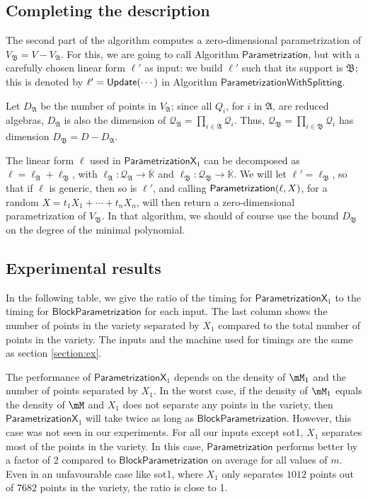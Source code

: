 \documentclass[12pt]{article}
\newcommand{\mainalgoname}{\mathsf{ BlockParametrization}}
\newcommand{\lf}{X}
\newcommand{\residueI}{\mathscr{Q}}
\def\Kbar {{\ensuremath{\overline{\mathbb{K}}}}}
\begin{document}

\subsection{Completing the description}

The second part of the algorithm computes a
zero-dimensional parametrization of
$V_\mathfrak{B}=V-V_\mathfrak{A}$. For this, we are going to call
Algorithm $\mathsf{ Parametrization}$, but with a carefully chosen linear
form $\ell'$ as input: we build $\ell'$ such that its support is
$\mathfrak{B}$; this is denoted by $\ell'={\sf Update}(\cdots)$ in
Algorithm $\mathsf{ParametrizationWithSplitting}$.

Let $D_{\mathfrak{A}}$ be the number of points in $V_{\mathfrak{A}}$;
since all $Q_i$, for $i$ in $\mathfrak{A}$, are reduced algebras,
$D_\mathfrak{A}$ is also the dimension of $\residueI_\mathfrak{A} =
\prod_{i \in \mathfrak{A}} \residueI_i$. Thus, $\residueI_\mathfrak{B}=\prod_{i \in \mathfrak{B}} \residueI_i$
has dimension $D_{\mathfrak{B}}=D-D_{\mathfrak{A}}$.

The linear form $\ell$ used in $\mathsf{ParametrizationX}_1$ can be
decomposed as $\ell= \ell_{\mathfrak{A}} + \ell_{\mathfrak{B}}$, with
$\ell_\mathfrak{A}: \residueI_\mathfrak{A} \to \Kbar$ and
$\ell_\mathfrak{B}: \residueI_\mathfrak{B} \to \Kbar$. We will let
$\ell'=\ell_{\mathfrak{B}}$, so that if $\ell$ is generic, then so is
$\ell'$, and calling ${\sf Parametrization}(\ell,\lf)$, for a random
$\lf=t_1 X_1 + \cdots + t_n X_n$, will then return a zero-dimensional
parametrization of $V_{\mathfrak{B}}$. In that algorithm, we should
of course use the bound $D_\mathfrak{B}$ on the degree of the minimal
polynomial.





\subsection{Experimental results}
In the following table, we give the ratio of the timing for $\mathsf{ParametrizationX}_1$
to the timing for $\mainalgoname$ for each input. The last column
shows the number of points in the variety separated by $X_1$ compared to the 
total number of points in the variety.
The inputs and the machine used for timings are the same as section \ref{section:ex}.

The performance of $\mathsf{ParametrizationX}_1$ depends on the density of $\mM_1$
and the number of points separated by $X_1$. 
In the worst case, if the density
of $\mM_1$ equals the density of $\mM$ and $X_1$ does not separate any points in 
the variety, then $\mathsf{ParametrizationX}_1$ will take twice as long as
$\mainalgoname$. However, this case was not seen in our experiments.
For all our inputs except sot1, 
$X_1$ separates most of the points in the variety. 
In this case, $\mathsf{Parametrization}$ performs better by
a factor of 2 compared to $\mainalgoname$ on average for all values of $m$.
Even in an unfavourable case like sot1, where $X_1$ only separates $1012$ points out of
$7682$ points in the variety, the ratio is close to 1.
\end{document}
